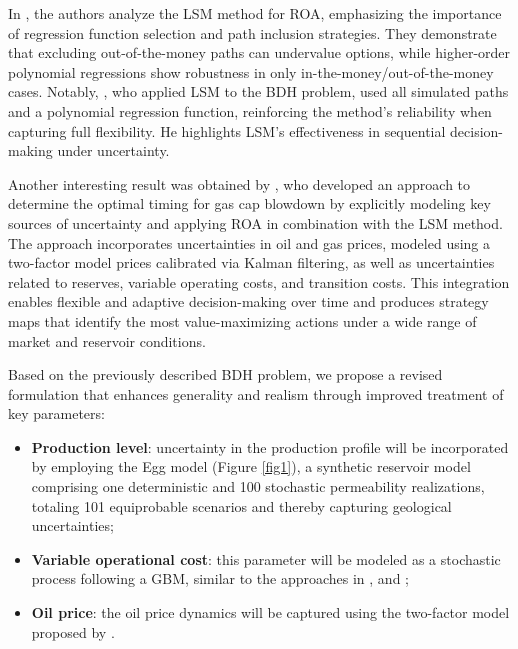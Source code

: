 \documentclass[pdflatex,sn-basic]{sn-jnl}%
\theoremstyle{thmstyleone}%
\theoremstyle{thmstyletwo}%
\theoremstyle{thmstylethree}%
\begin{document}
In \cite{ref15}, the authors analyze the LSM method for ROA, emphasizing the importance of regression function selection and path inclusion strategies. They demonstrate that excluding out-of-the-money paths can undervalue options, while higher-order polynomial regressions show robustness in only in-the-money/out-of-the-money cases. Notably, \cite{ref13}, who applied LSM to the BDH problem, used all simulated paths and a polynomial regression function, reinforcing the method's reliability when capturing full flexibility. He highlights LSM's effectiveness in sequential decision-making under uncertainty.

Another interesting result was obtained by \cite{ref16}, who developed an approach to determine the optimal timing for gas cap blowdown by explicitly modeling key sources of uncertainty and applying ROA in combination with the LSM method. The approach incorporates uncertainties in oil and gas prices, modeled using a two-factor model prices \citep{ref17} calibrated via Kalman filtering, as well as uncertainties related to reserves, variable operating costs, and transition costs. This integration enables flexible and adaptive decision-making over time and produces strategy maps that identify the most value-maximizing actions under a wide range of market and reservoir conditions. 

Based on the previously described BDH problem, we propose a revised formulation that enhances generality and realism through improved treatment of key parameters:
\begin{itemize}
    \item \textbf{Production level}: uncertainty in the production profile will be incorporated by employing the Egg model (Figure \ref{fig1}), a synthetic reservoir model comprising one deterministic and 100 stochastic permeability realizations, totaling 101 equiprobable scenarios \citep{ref18} and thereby capturing geological uncertainties;
    \item \textbf{Variable operational cost}: this parameter will be modeled as a stochastic process following a GBM, similar to the approaches in \cite{ref19}, \cite{ref20} and \cite{ref21};
    \item \textbf{Oil price}: the oil price dynamics will be captured using the two-factor model proposed by \cite{ref17}.
\end{itemize}
\end{document}
